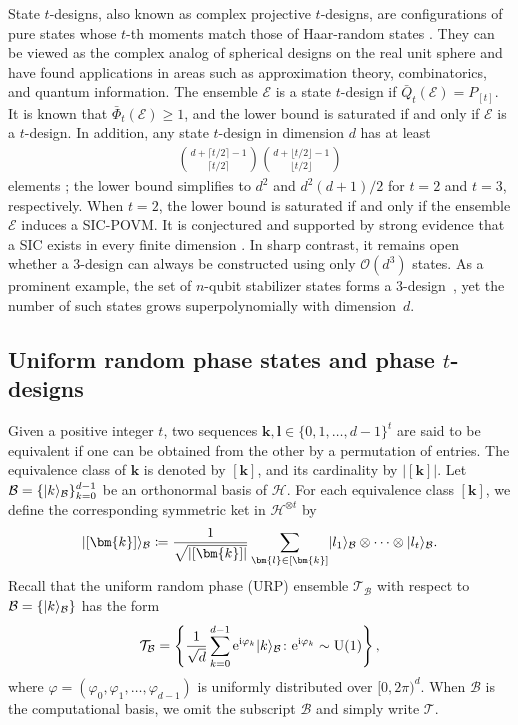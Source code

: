 \documentclass[aps,pra,twocolumn,nofootinbib,superscriptaddress,10pt]{revtex4-2}
\DeclarePairedDelimiter{\ket}{\lvert}{\rangle}
\newcommand{\bmk}{\bm{k}}
\newcommand{\bml}{\bm{l}}
\newcommand{\caB}{\mathcal{B}}
\newcommand{\caE}{\mathcal{E}}
\newcommand{\caH}{\mathcal{H}}
\newcommand{\caO}{\mathcal{O}}
\newcommand{\caT}{\mathcal{T}}
\newcommand{\rme}{\mathrm{e}}
\newcommand{\rmi}{\mathrm{i}}
\newcommand{\rmU}{\mathrm{U}}
\newcommand{\bQ}{\bar{Q}}
\newcommand{\bPhi}{\bar{\Phi}}
\begin{document}
State $t$-designs, also known as complex projective $t$-designs, are configurations of pure states whose $t$-th moments match those of Haar-random states \cite{Zauner11,Renes04,Scott06,Ambainis07}. They can be viewed as the complex analog of spherical designs on the real unit sphere and have found applications in areas such as approximation theory, combinatorics, and quantum information. The ensemble $\caE$ is a state $t$-design if $\bQ_t(\caE)=P_{[t]}$. It is known that $\bPhi_t(\caE)\geq 1$, and the lower bound is saturated if and only if $\caE$ is a $t$-design. In addition, any state $t$-design in dimension $d$ has at least
\begin{align}
\binom{d+\lceil t/2\rceil-1}{\lceil t/2\rceil} \binom{d+\lfloor t/2\rfloor-1}{\lfloor t/2\rfloor}
\end{align}
elements \cite{Hoggar82,Scott06}; the lower bound simplifies to $d^2$ and $d^2(d+1)/2$ for $t=2$ and $t=3$, respectively. When $t=2$, the lower bound is saturated if and only if the ensemble $\caE$ induces a SIC-POVM. It is conjectured and supported by strong evidence that a SIC exists in every finite dimension \cite{Fuchs17,Zauner11,Renes04,Scott10}.
In sharp contrast, it remains open whether a 3-design can always be constructed using only $\caO(d^3)$ states. As a prominent example, the set of $n$-qubit stabilizer states forms a 3-design~\cite{Kueng15,Zhu17,Webb16}, yet the number of such states grows superpolynomially with dimension~$d$.


\subsection{\texorpdfstring{Uniform random phase states and phase $t$-designs}{Uniform random phase states and phase t-designs}}
\label{app:RPtd}
Given a positive integer $t$, two sequences $\bmk,\bml \in \{0,1,\dots,d-1\}^t$ are said to be equivalent if one can be obtained from the other by a permutation of entries. The equivalence class of $\bmk$ is denoted by $[\bmk]$, and its cardinality by $|[\bmk]|$. Let $\caB = \{\ket{k}_\caB\}_{k=0}^{d-1}$ be an orthonormal basis of $\caH$. For each equivalence class $[\bmk]$, we define the corresponding symmetric ket in $\caH^{\otimes t}$ by
\begin{align}
\ket{[\bmk]}_\caB \coloneqq \frac{1}{\sqrt{|[\bmk]|}} \sum_{\bml \in [\bmk]} \ket{l_1}_\caB \otimes \cdots \otimes \ket{l_t}_\caB.
\end{align}
Recall that the uniform random phase (URP) ensemble $\caT_\caB$ with respect to $\caB=\{\ket{k}_\caB\}$ has the form
\begin{equation}
    \caT_\caB=\left\{\frac{1}{\sqrt{d}} \sum_{k=0}^{d-1} \rme^{\rmi \varphi_k} \ket{k}_\caB\colon \rme^{\rmi\varphi_k}\sim \rmU(1)\right\}, \label{eq:URPsupp}
\end{equation}
where $\varphi = (\varphi_0, \varphi_1, \dots, \varphi_{d-1})$ is uniformly distributed over $[0,2\pi)^d$. When $\caB$ is the computational basis, we omit the subscript $\caB$ and simply write $\caT$.
\end{document}

